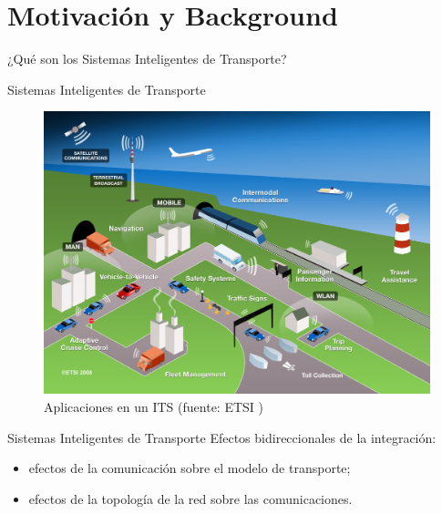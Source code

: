 \documentclass[aspectratio=169]{beamer}
\begin{document}
\section{Motivación y Background}

\begin{frame}[standout]
\centering
¿Qué son los Sistemas Inteligentes de Transporte?
\end{frame}

\begin{frame}{Sistemas Inteligentes de Transporte}
\begin{figure}
    \centering
    \includegraphics[height=0.8\textheight]{figuras/ITS.png}
    \caption{Aplicaciones en un ITS (fuente: ETSI \autocite{etsi})}
    \label{fig:itsetsi}
\end{figure}
\end{frame}

\begin{frame}{Sistemas Inteligentes de Transporte}
Efectos bidireccionales de la integración:\pause
\begin{itemize}
    \item efectos de la comunicación sobre el modelo de transporte;\pause
    \item efectos de la topología de la red sobre las comunicaciones.
\end{itemize}
\end{frame}
\end{document}
